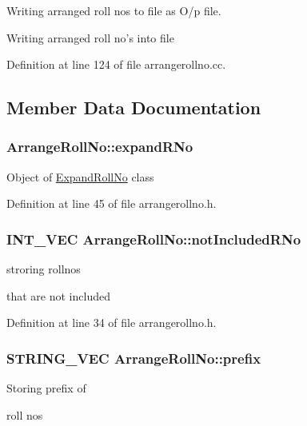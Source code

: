 Writing arranged roll nos to file as O/p file. 

Writing arranged roll no's into file 

Definition at line 124 of file arrangerollno.\-cc.



\subsection{Member Data Documentation}
\hypertarget{classArrangeRollNo_a7ddd59b57f85cf6fea265d38c284df92}{
\subsubsection[{expand\-R\-No}]{ Arrange\-Roll\-No\-::expand\-R\-No\hspace{0.3cm}{\ttfamily [protected]}}}\label{classArrangeRollNo_a7ddd59b57f85cf6fea265d38c284df92}
Object of \hyperlink{classExpandRollNo}{Expand\-Roll\-No} class 

Definition at line 45 of file arrangerollno.\-h.

\hypertarget{classArrangeRollNo_a1f6740950e3180731b74c3ecdc19b98c}{
\subsubsection[{not\-Included\-R\-No}]{\setlength{\rightskip}{0pt plus 5cm}I\-N\-T\-\_\-\-V\-E\-C Arrange\-Roll\-No\-::not\-Included\-R\-No\hspace{0.3cm}{\ttfamily [protected]}}}\label{classArrangeRollNo_a1f6740950e3180731b74c3ecdc19b98c}
\begin{DoxyVerb} stroring rollnos 
\end{DoxyVerb}
 that are not included 

Definition at line 34 of file arrangerollno.\-h.

\hypertarget{classArrangeRollNo_ac70b1f6e601cc5786ef339a38ae18c6f}{
\subsubsection[{prefix}]{\setlength{\rightskip}{0pt plus 5cm}S\-T\-R\-I\-N\-G\-\_\-\-V\-E\-C Arrange\-Roll\-No\-::prefix\hspace{0.3cm}{\ttfamily [protected]}}}\label{classArrangeRollNo_ac70b1f6e601cc5786ef339a38ae18c6f}
\begin{DoxyVerb} Storing prefix of 
\end{DoxyVerb}
 roll nos 

